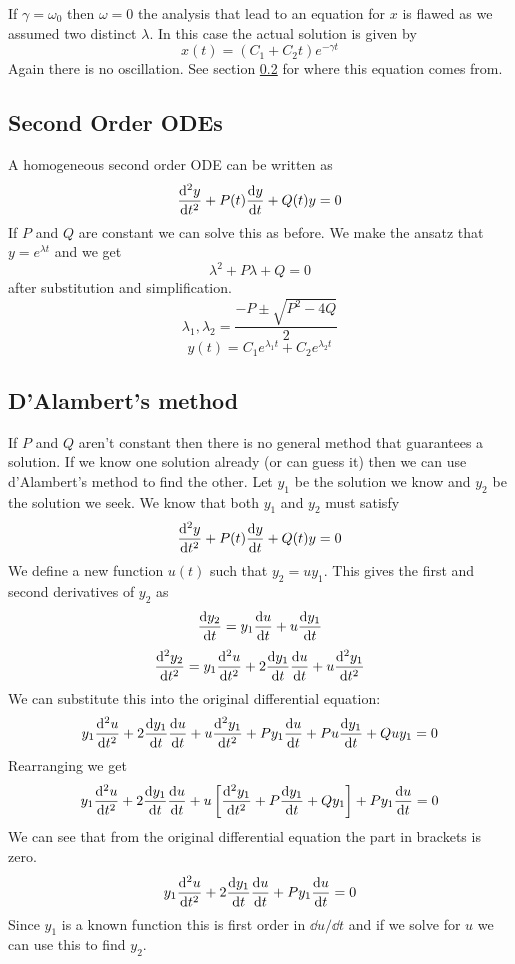 \documentclass{article}
\begin{document}
    If \(\gamma = \omega_0\) then \(\omega = 0\) the analysis that lead to an equation for \(x\) is flawed as we assumed two distinct \(\lambda\).
    In this case the actual solution is given by
    \[x(t) = (C_1 + C_2t)e^{-\gamma t}\]
    Again there is no oscillation.
    See section \ref{sec:d'Alambert's method} for where this equation comes from.
    
    \subsection{Second Order ODEs}
    A homogeneous second order ODE can be written as
    \[\dv[2]{y}{t} + P(t)\dv{y}{t} + Q(t)y = 0\]
    If \(P\) and \(Q\) are constant we can solve this as before.
    We make the ansatz that \(y = e^{\lambda t}\) and we get
    \[\lambda^2 + P\lambda + Q = 0\]
    after substitution and simplification.
    \[\lambda_1, \lambda_2 = \frac{-P \pm \sqrt{P^2 - 4Q}}{2}\]
    \[y(t) = C_1e^{\lambda_1 t} + C_2e^{\lambda_2 t}\]
    
    \subsection{D'Alambert's method}\label{sec:d'Alambert's method}
    If \(P\) and \(Q\) aren't constant then there is no general method that guarantees a solution.
    If we know one solution already (or can guess it) then we can use d'Alambert's method to find the other.
    Let \(y_1\) be the solution we know and \(y_2\) be the solution we seek.
    We know that both \(y_1\) and \(y_2\) must satisfy
    \[\dv[2]{y}{t} + P(t)\dv{y}{t} + Q(t)y = 0\]
    We define a new function \(u(t)\) such that \(y_2 = uy_1\).
    This gives the first and second derivatives of \(y_2\) as
    \[\dv{y_2}{t} = y_1\dv{u}{t} + u\dv{y_1}{t}\]
    \[\dv[2]{y_2}{t} = y_1\dv[2]{u}{t} + 2\dv{y_1}{t}\dv{u}{t} + u\dv[2]{y_1}{t}\]
    We can substitute this into the original differential equation:
    \[y_1\dv[2]{u}{t} + 2\dv{y_1}{t}\dv{u}{t} + u\dv[2]{y_1}{t} + Py_1\dv{u}{t} + Pu\dv{y_1}{t} + Quy_1 = 0\]
    Rearranging we get
    \[y_1\dv[2]{u}{t} + 2\dv{y_1}{t}\dv{u}{t} + u\left[\dv[2]{y_1}{t} + P\dv{y_1}{t} + Qy_1\right] + Py_1\dv{u}{t} = 0\]
    We can see that from the original differential equation the part in brackets is zero.
    \[y_1\dv[2]{u}{t} + 2\dv{y_1}{t}\dv{u}{t} + Py_1\dv{u}{t} = 0\]
    Since \(y_1\) is a known function this is first order in \(\dd u/\dd t\) and if we solve for \(u\) we can use this to find \(y_2\).
    
\end{document}
